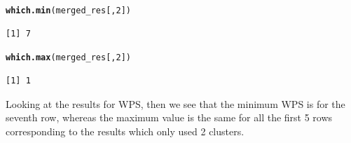 \documentclass[10pt, a4paper, english]{article}\usepackage[]{graphicx}\usepackage[dvipsnames]{xcolor}
\makeatletter
\newcommand{\hlnum}[1]{\textcolor[rgb]{0.686,0.059,0.569}{#1}}%
\newcommand{\hlstd}[1]{\textcolor[rgb]{0.345,0.345,0.345}{#1}}%
\newcommand{\hlkwd}[1]{\textcolor[rgb]{0.737,0.353,0.396}{\textbf{#1}}}%
\newenvironment{kframe}{%
 \def\at@end@of@kframe{}%
 \ifinner\ifhmode%
  \def\at@end@of@kframe{\end{minipage}}%
  \begin{minipage}{\columnwidth}%
 \fi\fi%
 \def\FrameCommand##1{\hskip\@totalleftmargin \hskip-\fboxsep
 \colorbox{shadecolor}{##1}\hskip-\fboxsep
     \hskip-\linewidth \hskip-\@totalleftmargin \hskip\columnwidth}%
 \MakeFramed {\advance\hsize-\width
   \@totalleftmargin\z@ \linewidth\hsize
   \@setminipage}}%
 {\par\unskip\endMakeFramed%
 \at@end@of@kframe}
\newenvironment{knitrout}{}{} %
\makeatother
\begin{document}
\begin{knitrout}
\begin{kframe}
\begin{alltt}
\hlkwd{which.min}\hlstd{(merged_res[,}\hlnum{2}\hlstd{])}
\end{alltt}
\begin{verbatim}
[1] 7
\end{verbatim}
\begin{alltt}
\hlkwd{which.max}\hlstd{(merged_res[,}\hlnum{2}\hlstd{])}
\end{alltt}
\begin{verbatim}
[1] 1
\end{verbatim}
\end{kframe}
\end{knitrout}
Looking at the results for WPS, then we see that the minimum WPS is for the seventh row, whereas the maximum value is the same for all the first 5 rows corresponding to the results which only used 2 clusters.
\end{document}
